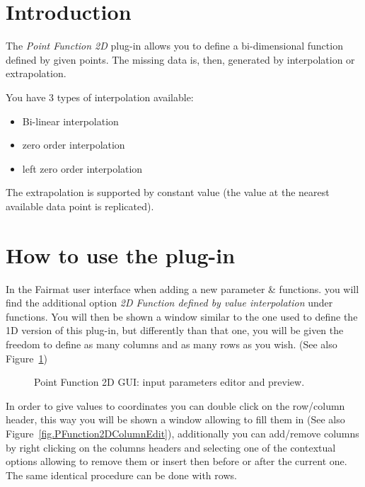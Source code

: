 \newcommand{\pluginName}{Point Function 2D}
\newcommand{\pluginVersion}{1.0.0}



\section{Introduction}
The \emph{Point Function 2D} plug-in allows you to define a bi-dimensional function defined by given points. The missing data is, then, generated by interpolation or extrapolation.

You have 3 types of interpolation available:
\begin{itemize}
\item Bi-linear interpolation
\item zero order interpolation
\item left zero order interpolation
\end{itemize}

The extrapolation is supported by constant value (the value at the nearest available data point is replicated).

\section{How to use the plug-in}
In the Fairmat user interface when adding a new parameter \& functions.
you will find the additional option \emph{2D Function defined by value interpolation} under functions.
You will then be shown a window similar to the one used to define the 1D version of this plug-in, but differently than that one, you will be given the freedom to define as many columns and as many rows as you wish. (See also Figure~\ref{fig.PFunction2DGUI})

\begin{figure}[h]
\begin{center}
\caption{Point Function 2D GUI: input parameters editor and preview.}
\label{fig.PFunction2DGUI}
\end{center}
\end{figure}

In order to give values to coordinates you can double click on the row/column header, this way you will be shown 
a window allowing to fill them in (See also Figure~\ref{fig.PFunction2DColumnEdit}), additionally you can add/remove columns by right clicking on the columns headers and selecting one of the contextual options allowing to remove them or insert then before or after the current one. The same identical procedure can be done with rows.

